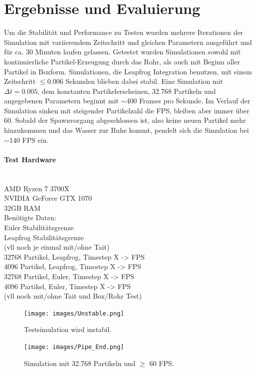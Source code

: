 \documentclass[a4paper]{paper}
\begin{document}
\section{Ergebnisse und Evaluierung}

Um die Stabilität und Performance zu Testen wurden mehrere Iterationen der Simulation mit variierendem Zeitschritt und gleichen Parametern ausgeführt und für ca. 30 Minuten laufen gelassen. Getestet wurden Simulationen sowohl mit kontinuierliche Partikel-Erzeugung durch das Rohr, als auch mit Beginn aller Partikel in Boxform. Simulationen, die Leapfrog Integration benutzen, mit einem Zeitschritt $\leq 0.006$ Sekunden blieben dabei stabil. Eine  Simulation mit $\Delta t = 0.005$, dem konstanten Partikelerscheinen, 32.768 Partikeln und angegebenen Parametern beginnt mit $\sim$400 Frames pro Sekunde. Im Verlauf der Simulation sinken mit steigender Partikelzahl die FPS, bleiben aber immer über 60. Sobald der Spawnvorgang abgeschlossen ist, also keine neuen Partikel mehr hinzukommen und das Wasser zur Ruhe kommt, pendelt sich die Simulation bei $\sim$140 FPS ein. 



\paragraph{Test Hardware}\mbox{}\\
AMD Ryzen 7 3700X \\
NVIDIA GeForce GTX 1070\\
32GB RAM\\

Benötigte Daten:\\
Euler Stabilitätsgrenze\\
Leapfrog Stabilitätsgrenze\\
(vll noch je einmal mit/ohne Tait)\\

32768 Partikel, Leapfrog, Timestep X -> FPS\\
4096 Partikel, Leapfrog, Timestep X -> FPS\\
32768 Partikel, Euler, Timestep X -> FPS\\
4096 Partikel, Euler, Timestep X -> FPS\\
(vll noch mit/ohne Tait und Box/Rohr Test)\\

\begin{figure}[t]
	\centering
	\texttt{[image: images/Unstable.png]}
	\caption{Testsimulation wird instabil.}
	\label{fig:unstable}
\end{figure}
\begin{figure}[t]
	\centering
	\texttt{[image: images/Pipe\_End.png]}
	\caption{Simulation mit 32.768 Partikeln und $\geq$ 60 FPS.}
	\label{fig:final_simulation}
\end{figure}
\end{document}

